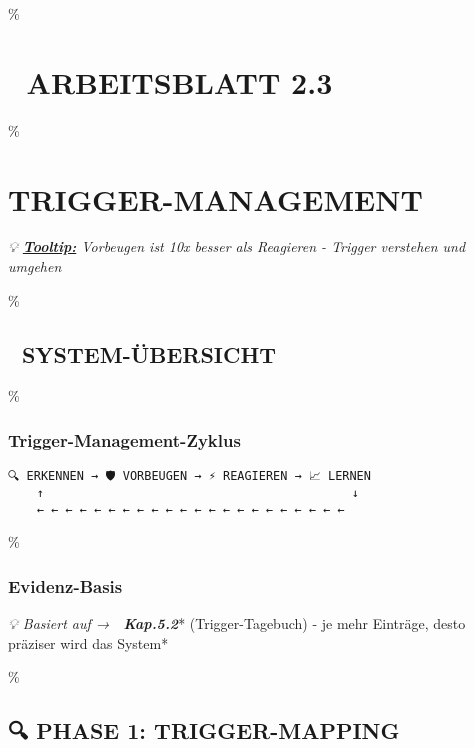 \hypertarget{arbeitsblatt-2.3}{\%
\section{\texorpdfstring{🎢 \textbf{ARBEITSBLATT 2.3} }{🎢 ARBEITSBLATT 2.3 }}\label{arbeitsblatt-2.3}}

\hypertarget{trigger-management}{\%
\section{\texorpdfstring{\textbf{TRIGGER-MANAGEMENT}}{TRIGGER-MANAGEMENT}}\label{trigger-management}}

\emph{💡 \textbf{\ul{Tooltip:}} Vorbeugen ist 10x besser als Reagieren - Trigger verstehen und umgehen}

\hypertarget{system-uxfcbersicht}{\%
\subsection{\texorpdfstring{🎯 \textbf{SYSTEM-ÜBERSICHT}}{🎯 SYSTEM-ÜBERSICHT}}\label{system-uxfcbersicht}}

\hypertarget{trigger-management-zyklus}{\%
\subsubsection{\texorpdfstring{\textbf{Trigger-Management-Zyklus}}{Trigger-Management-Zyklus}}\label{trigger-management-zyklus}}

\begin{verbatim}
🔍 ERKENNEN → 🛡️ VORBEUGEN → ⚡ REAGIEREN → 📈 LERNEN
    ↑                                           ↓
    ← ← ← ← ← ← ← ← ← ← ← ← ← ← ← ← ← ← ← ← ← ←
\end{verbatim}

\hypertarget{evidenz-basis}{\%
\subsubsection{\texorpdfstring{\textbf{Evidenz-Basis}}{Evidenz-Basis}}\label{evidenz-basis}}

\emph{💡 Basiert auf → 📝 \textbf{Kap.5.2}}* (Trigger-Tagebuch) - je mehr Einträge, desto präziser wird das System*

\hypertarget{phase-1-trigger-mapping}{\%
\subsection{\texorpdfstring{🔍 \textbf{PHASE 1: TRIGGER-MAPPING}}{🔍 PHASE 1: TRIGGER-MAPPING}}\label{phase-1-trigger-mapping}}

